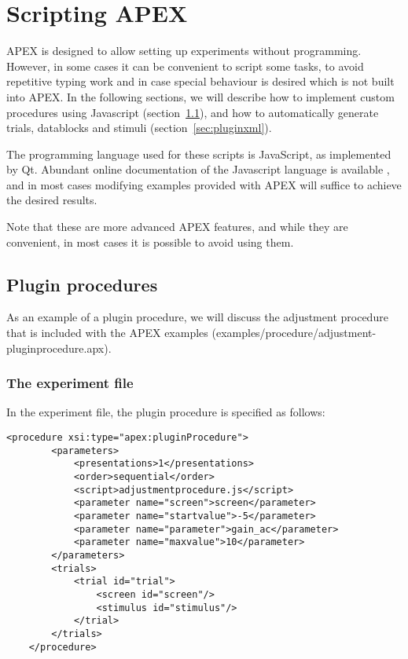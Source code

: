 \chapter{Scripting APEX}
\label{chap:scripting}

APEX is designed to allow setting up experiments without programming. However, in some cases it can be convenient to script some tasks, to avoid repetitive typing work and in case special behaviour is desired which is not built into APEX. In the following sections, we will describe how to implement custom procedures using Javascript (section~\ref{sec:pluginprocedure}), and how to automatically generate trials, datablocks and stimuli (section~\ref{sec:pluginxml}).

The programming language used for these scripts is JavaScript, as implemented by Qt. Abundant online documentation of the Javascript language is available , and in most cases modifying examples provided with APEX will suffice to achieve the desired results.

Note that these are more advanced APEX features, and while they are convenient, in most cases it is possible to avoid using them.

\section{Plugin procedures}
\label{sec:pluginprocedure}

As an example of a plugin procedure, we will discuss the adjustment procedure that is included with the APEX examples (examples/procedure/adjustment-pluginprocedure.apx).

\subsection{The experiment file}

In the experiment file, the plugin procedure is specified as follows:

\begin{lstlisting}
<procedure xsi:type="apex:pluginProcedure">
        <parameters>
            <presentations>1</presentations>
            <order>sequential</order>
            <script>adjustmentprocedure.js</script>
            <parameter name="screen">screen</parameter>
            <parameter name="startvalue">-5</parameter>
            <parameter name="parameter">gain_ac</parameter>
            <parameter name="maxvalue">10</parameter>
        </parameters>
        <trials>
            <trial id="trial">
                <screen id="screen"/>
                <stimulus id="stimulus"/>
            </trial>
        </trials>
    </procedure>
\end{lstlisting}

